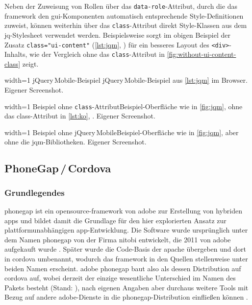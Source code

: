 Neben der Zuweisung von Rollen über das \lstinline|data-role|-Attribut, durch die das \gls{framework} den \gls{gui}-Komponenten automatisch entsprechende Style-Definitionen zuweist, können weiterhin über das \lstinline|class|-Attribut direkt Style-Klassen aus dem \gls{jq}-Stylesheet verwendet werden.
Beispielsweise sorgt im obigen Beispiel der Zusatz \lstinline|class="ui-content"| (\autoref{lst:jqm}, ) für ein besseres Layout des \lstinline|<div>|-Inhalts, wie der Vergleich ohne das \lstinline|class|-Attribut in \autoref{fig:without-ui-content-class} zeigt.


	{width=1\textwidth}
	{jQuery\,\-Mobile-Beispiel}
	{jQuery\,\-Mobile-Beispiel aus \autoref{lst:jqm} im Browser.}
	{Eigener Screenshot.}

	{width=1\textwidth}
	{Beispiel ohne \lstinline|class|-Attribut}{Beispiel-Oberfläche wie in \autoref{fig:jqm}, ohne das class-Attribut in \autoref{lst:ko}, .}
	{Eigener Screenshot.}

	{width=1\textwidth}
	{Beispiel ohne jQuery\,\-Mobile}{Beispiel-Oberfläche wie in \autoref{fig:jqm}, aber ohne die \gls{jqm}-Bibliotheken.}
	{Eigener Screenshot.}

\subsection{PhoneGap\,/\,Cordova} \label{sec:cordova}


\subsubsection{Grundlegendes} \label{sec:cordova-grundlegendes}

\gls{phonegap} ist ein \gls{opensource}-\gls{framework} von \gls{adobe} zur Erstellung von hybriden \glspl{app} und bildet damit die Grundlage für den hier explorierten Ansatz zur plattformunabhängigen \gls{app}-Entwicklung.
Die Software wurde ursprünglich unter dem Namen \gls{phonegap} von der Firma \gls{nitobi} entwickelt, die 2011 von \gls{adobe} aufgekauft wurde \cite{Adobe_Announces_Agreement_to_Acquire_Nitobi_Creator_of_PhoneGap}. 
Später wurde die Code-Basis der \gls{apache} übergeben und dort in \gls{cordova} umbenannt, wodurch das \gls{framework} in den Quellen stellenweise unter beiden Namen erscheint.
\Gls{adobe} \gls{phonegap} baut also als dessen Distribution auf \gls{cordova} auf, wobei derzeit der einzige wesentliche Unterschied im Namen des Pakets besteht (Stand: ), nach eigenen Angaben aber durchaus weitere Tools mit Bezug auf andere \gls{adobe}-Dienste in die \gls{phonegap}-Distribution einfließen können \cite{PhoneGap_Cordova_and_whats_in_a_name}.

